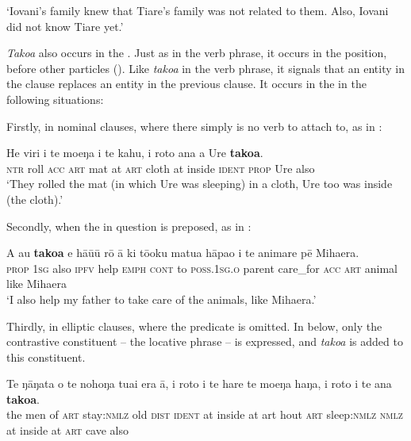 \glt 
‘Iovani’s family knew that Tiare’s family was not related to them. Also, Iovani did not know Tiare yet.’ \textstyleExampleref{[R238.004–005]}
\z

\textit{Tako{\ꞌ}a} also occurs in the . Just as in the verb phrase, it occurs in the  position, before other particles (). Like \textit{tako{\ꞌ}a} in the verb phrase, it signals that an entity in the clause replaces an entity in the previous clause. It occurs in the  in the following situations:

Firstly, in nominal clauses, where there simply is no verb to attach to, as in :

\ea\label{ex:4.135}
\gll He viri i te moeŋa {\ꞌ}i te kahu, {\ꞌ}i roto {\ꞌ}ana a Ure \textbf{tako{\ꞌ}a}. \\
\textsc{ntr} roll \textsc{acc} \textsc{art} mat at \textsc{art} cloth at inside \textsc{ident} \textsc{prop} Ure also \\

\glt
‘They rolled the mat (in which Ure was sleeping) in a cloth, Ure too was inside (the cloth).’ \textstyleExampleref{[Mtx-7-03.016]}
\z

Secondly, when the  in question is preposed, as in :

\ea\label{ex:4.136}
\gll A au \textbf{tako{\ꞌ}a} e hā{\ꞌ}ū{\ꞌ}ū rō {\ꞌ}ā ki tō{\ꞌ}oku matu{\ꞌ}a hāpa{\ꞌ}o  i te {\ꞌ}animare pē Mihaera.\\
\textsc{prop} \textsc{1sg} also \textsc{ipfv} help \textsc{emph} \textsc{cont} to \textsc{poss.1sg.o} parent care\_for  \textsc{acc} \textsc{art} animal like Mihaera\\

\glt
‘I also help my father to take care of the animals, like Mihaera.’ \textstyleExampleref{[R334.293]} 
\z

Thirdly, in elliptic clauses, where the predicate is omitted. In  below, only the contrastive constituent – the locative phrase – is expressed, and \textit{tako{\ꞌ}a} is added to this constituent. 

\ea\label{ex:4.137}
\gll Te ŋāŋata o te nohoŋa tuai era {\ꞌ}ā, {\ꞌ}i roto i te hare te moeŋa  haŋa, {\ꞌ}i roto i te {\ꞌ}ana \textbf{tako{\ꞌ}a}.\\
the men of \textsc{art} stay:\textsc{nmlz} old \textsc{dist} \textsc{ident} at inside at art hout \textsc{art} sleep:\textsc{nmlz}  \textsc{nmlz} at inside at \textsc{art} cave also\\

